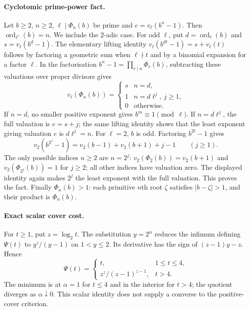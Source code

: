 \documentclass[11pt]{article}
\begin{document}
\paragraph{Cyclotomic prime-power fact.}
Let $b\ge2$, $n\ge2$, $\ell\mid\Phi_n(b)$ be prime and
$e=v_\ell(b^n-1)$.  Then $\operatorname{ord}_{\ell^e}(b)=n$.
We include the $2$-adic case.
For odd $\ell$, put $d=\operatorname{ord}_{\ell}(b)$ and
$s=v_\ell(b^d-1)$.  The elementary lifting identity
$v_\ell(b^{dt}-1)=s+v_\ell(t)$ follows by factoring a geometric sum
when $\ell\nmid t$ and by a binomial expansion for a factor $\ell$.
In the factorisation $b^n-1=\prod_{r\mid n}\Phi_r(b)$, subtracting
these valuations over proper divisors gives
\[
 v_\ell(\Phi_n(b))=
 \begin{cases}s&n=d,\\1&n=d\ell^j,\ j\ge1,\\0&\text{otherwise.}\end{cases}
\]
If $n=d$, no smaller positive exponent gives $b^m\equiv1\pmod\ell$.
If $n=d\ell^j$, the full valuation is $e=s+j$; the same lifting
identity shows that the least exponent giving valuation $e$ is
$d\ell^j=n$.
For $\ell=2$, $b$ is odd.  Factoring $b^{2t}-1$ gives
\[
 v_2(b^{2^j}-1)=v_2(b-1)+v_2(b+1)+j-1\qquad(j\ge1).
\]
The only possible indices $n\ge2$ are $n=2^j$:
$v_2(\Phi_2(b))=v_2(b+1)$ and
$v_2(\Phi_{2^j}(b))=1$ for $j\ge2$; all other indices have
valuation zero.  The displayed identity again makes $2^j$ the least
exponent with the full valuation.  This proves the fact.
Finally $\Phi_n(b)>1$: each primitive $n$th root $\zeta$ satisfies
$|b-\zeta|>1$, and their product is $\Phi_n(b)$.

\paragraph{Exact scalar cover cost.}
For $t\ge1$, put $z=\log_2t$.  The substitution $y=2^\alpha$
reduces the infimum defining $\Psi(t)$ to $y^z/(y-1)$ on $1<y\le2$.
Its derivative has the sign of $(z-1)y-z$.  Hence
\[
 \Psi(t)=
 \begin{cases}t,&1\le t\le4,\\
 z^z/(z-1)^{z-1},&t>4.
 \end{cases}
\]
The minimum is at $\alpha=1$ for $t\le4$ and in the interior for $t>4$;
the quotient diverges as $\alpha\downarrow0$. This scalar identity does
not supply a converse to the positive-cover criterion.
\end{document}

